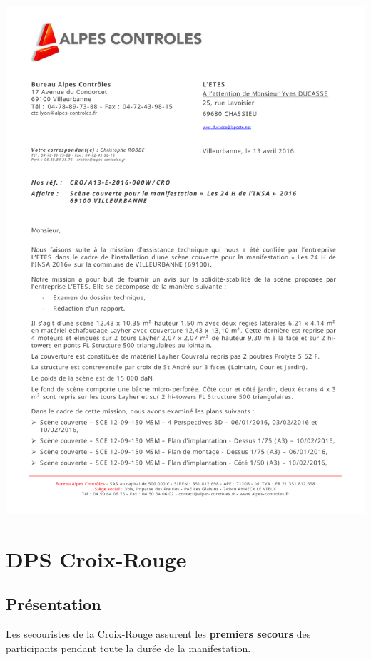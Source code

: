 \documentclass[hidelinks, paper=a4, fontsize=13pt]{report}
\begin{document}
\begin{center}
	\includegraphics[page=2,scale=0.7]{Annexes/Documents/StabiliteGrandeScene}
\end{center}

\section{DPS Croix-Rouge}

\subsection{Présentation}
Les secouristes de la Croix-Rouge assurent les \textbf{premiers secours} des participants pendant toute la durée de la manifestation.\\
\end{document}
